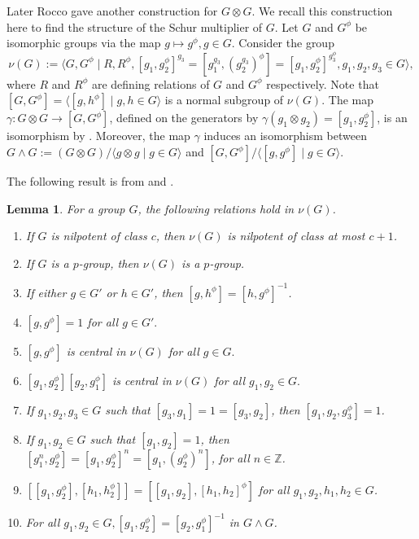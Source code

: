 \documentclass[preprint,sort&compress,12pt]{elsarticle}
\newtheorem{lemma}[theorem]{Lemma}
\numberwithin{equation}{section}
\theoremstyle{definition}
\begin{document}
Later Rocco \cite{Rocco1991} gave another construction for $G \otimes G$. We recall this construction here to find the structure of the Schur multiplier of $G$.
Let $G$ and $G^\phi$ be isomorphic groups via the map $ g \mapsto g^\phi ,g\in G.$ Consider the group
$$\nu(G):=\langle G,G^\phi \mid R,R^\phi,[g_1,g_2^\phi]^{g_3}=[g_1^{g_3},(g_2^{g_3})^\phi]=[g_1,g_2^\phi]^{g_3^\phi} ,g_1,g_2,g_3 \in G \rangle,$$
where $R$ and $R^{\phi}$ are defining relations of $G$ and $G^{\phi}$ respectively.
Note that $[G,G^\phi]=\langle[g,h^\phi] \mid g,h \in G\rangle$ is a normal subgroup of $\nu(G).$ The map $\gamma: G \otimes G \to [G,G^\phi]$, defined on the generators by $\gamma(g_1 \otimes g_2)=[g_1,g_2^\phi]$, is an isomorphism by \cite[Proposition 2.6]{Rocco1991}. Moreover, the map $\gamma$ induces an isomorphism between $G \wedge G:=(G \otimes G)/\langle g \otimes g \mid g \in G \rangle$ and $[G,G^\phi]/\langle[g,g^\phi] \mid g \in G\rangle.$ 

The following result is from \cite[Lemma 2.1, 2.2, 2.3]{Rocco1991} and \cite[Lemma 9]{Blyth2009}.
\begin{lemma} \label{Rocco remark} 
    For a group $G$, the following relations hold in $\nu(G)$.
    \begin{enumerate}
        \item [(i)] If $G$ is nilpotent of class $c$, then $\nu(G)$ is nilpotent of class at most $c+1$.
        \item[(ii)] If $G$ is a $p$-group, then $\nu(G)$ is a $p$-group.
        \item[(iii)] If either $g \in G'$ or $h \in G'$, then $[g,h^\phi]=[h,g^\phi]^{-1}$.
        \item[(iv)] $[g,g^\phi]=1$ for all $g \in G'.$ 
        \item[(v)] $[g,g^\phi]$ is central in $\nu(G)$ for all $g \in G.$ 
        \item[(vi)]  $[g_1,g_2^\phi][g_2,g_1^\phi]$ is central in $\nu(G)$ for all $g_1,g_2 \in G.$
        \item[(vii)] If $g_1,g_2,g_3\in G$ such that $[g_3,g_1]=1=[g_3,g_2]$, then $[g_1,g_2,g_3^\phi]=1$.
        \item[(viii)] If $g_1,g_2\in G$ such that $[g_1,g_2]=1$, then $[g_1^{n},g_2^\phi]=[g_1,g_2^\phi]^n=[g_1,(g_2^\phi)^n]$, for all $n \in \mathbb{Z}$.
        \item [(ix)] $[[g_1,g_2^\phi],[h_1,h_2^\phi]]=[[g_1,g_2],[h_1,h_2]^\phi]$ for all $g_1,g_2,h_1,h_2 \in G$.
        \item [(x)] For all $g_1,g_2 \in G,[g_1,g_2^\phi]=[g_2,g_1^\phi]^{-1}$ in $G \wedge G$.
    \end{enumerate}
\end{lemma}
\end{document}
